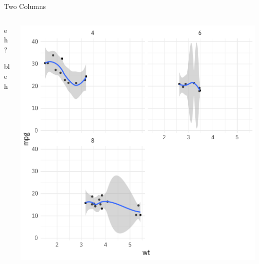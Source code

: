 \documentclass[ignorenonframetext,]{beamer}
\newif\ifbibliography
\begin{document}
\begin{frame}{Two Columns}
\protect\hypertarget{two-columns}{}
\begin{columns}
\begin{column}{0.5\textwidth}

  \bi
    \item eh?
    \item bleh
  \ei

\end{column}
\begin{column}{0.5\textwidth}
    \begin{center}
     \includegraphics[width=1\textwidth]{../../output/figures/fig.pdf}
     \end{center}
\end{column}
\end{columns}
\end{frame}


  \begin{frame}[allowframebreaks]{}
  \bibliographytrue
  \printbibliography[heading=none]
  \end{frame}
\end{document}
